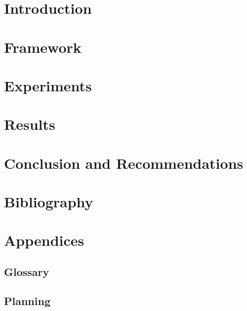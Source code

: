 \documentclass{report}
\begin{document}
\chapter{Introduction}



\chapter{Framework}



\chapter{Experiments}



\chapter{Results}



\chapter{Conclusion and Recommendations}



\chapter{Bibliography}



\appendix
{}
\chapter*{Appendices}
\renewcommand{\thesection}{\Alph{section}}
\section{Glossary}

\section{Planning}

\end{document}
